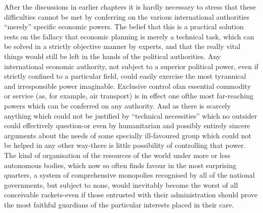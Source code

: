 \documentclass[11pt,openany]{book}
\begin{document}
\begin{center}\textasteriskcentered\hspace{0.9em}\textasteriskcentered\hspace{0.9em}\textasteriskcentered\end{center}

After the discussions in earlier chapters it is hardly necessary to stress that these difficulties cannot be met by conferring on the various international authorities ``merely'' specific economic powers. The belief that this is a practical solution rests on the fallacy that economic planning is merely a technical task, which can be solved in a strictly objective manner by experts, and that the really vital things would still be left in the hands of the political authorities. Any international economic authority, not subject to a superior political power, even if strictly confined to a particular field, could easily exercise the most tyrannical and irresponsible power imaginable. Exclusive control ofan essential commodity or service (as, for example, air transport) is in effect one ofthe most far-reaching powers which can be conferred on any authority. And as there is scarcely anything which could not be justified by ``technical necessities'' which no outsider could effectively question-or even by humanitarian and possibly entirely sincere arguments about the needs of some specially ill-favoured group which could not be helped in any other way-there is little possibility of controlling that power. The kind of organisation of the resources of the world under more or less autonomous bodies, which now so often finds favour in the most surprising quarters, a system of comprehensive monopolies recognised by all of the national governments, but subject to none, would inevitably become the worst of all conceivable rackets-even if those entrusted with their administration should prove the most faithful guardians of the particular interests placed in their care.
\end{document}
